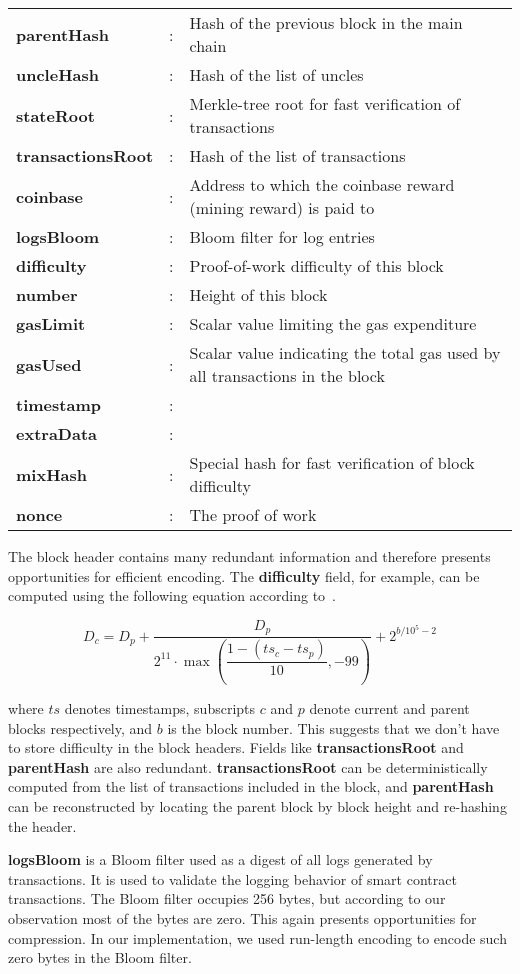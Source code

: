 \begin{table}[H]
	\centering
\begin{tabular}{>{\bfseries}l c l}
 parentHash&:& Hash of the previous block in the main chain\\
 uncleHash&:& Hash of the list of uncles\\
 stateRoot&:& Merkle-tree root for fast verification of transactions\\
 transactionsRoot&:& Hash of the list of transactions\\
 coinbase&:& Address to which the coinbase reward (mining reward) is paid to\\
 logsBloom&:& Bloom filter for log entries\\
 difficulty&:& Proof-of-work difficulty of this block\\
 number&:& Height of this block\\
 gasLimit&:& Scalar value limiting the gas expenditure\\
 gasUsed&:& Scalar value indicating the total gas used by all transactions in the block\\
 timestamp&:&\\
 extraData&:&\\
 mixHash&:& Special hash for fast verification of block difficulty\\
 nonce&:& The proof of work\\
\end{tabular}
\end{table}

The block header contains many redundant information and therefore presents opportunities for efficient encoding.
The \textbf{difficulty} field, for example, can be computed using the following equation according to~\cite{ethereum}.

$$
D_{c} = D_{p} + \dfrac{D_{p}}{2^{11}\cdot\max\left(\dfrac{1 - (ts_{c} - ts_{p})}{10}, -99\right)} + 2^{b/10^5-2}
$$

where $ts$ denotes timestamps, subscripts $c$ and $p$ denote current and parent blocks respectively, and $b$ is the block number.
This suggests that we don't have to store difficulty in the block headers.
Fields like \textbf{transactionsRoot} and \textbf{parentHash} are also redundant.
\textbf{transactionsRoot} can be deterministically computed from the list of transactions included in the block,
and \textbf{parentHash} can be reconstructed by locating the parent block by block height and re-hashing the header.

\textbf{logsBloom} is a Bloom filter used as a digest of all logs generated by transactions.
It is used to validate the logging behavior of smart contract transactions. The Bloom filter occupies 256 bytes,
but according to our observation most of the bytes are zero. This again presents opportunities for compression.
In our implementation, we used run-length encoding to encode such zero bytes in the Bloom filter.

